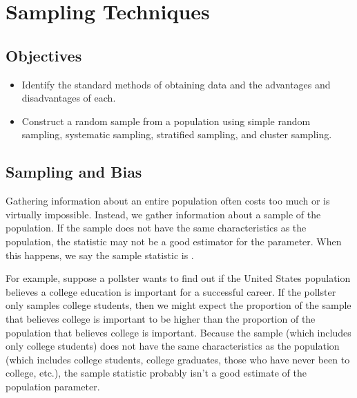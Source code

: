 \documentclass[letterpaper,10pt,english]{jupyterBook}
\begin{document}
\sphinxstepscope


\section{Sampling Techniques}
\label{\detokenize{Ch1 Sampling and Data/1.3 Sampling Techniques:sampling-techniques}}\label{\detokenize{Ch1 Sampling and Data/1.3 Sampling Techniques::doc}}

\subsection{Objectives}
\label{\detokenize{Ch1 Sampling and Data/1.3 Sampling Techniques:objectives}}\begin{itemize}
\item {} 
\sphinxAtStartPar
Identify the standard methods of obtaining data and the advantages and disadvantages of each.

\item {} 
\sphinxAtStartPar
Construct a random sample from a population using simple random sampling, systematic sampling, stratified sampling, and cluster sampling.

\end{itemize}


\subsection{Sampling and Bias}
\label{\detokenize{Ch1 Sampling and Data/1.3 Sampling Techniques:sampling-and-bias}}
\sphinxAtStartPar
Gathering information about an entire population often costs too much or is virtually impossible. Instead, we gather information about a sample of the population.  If the sample does not have the same characteristics as the population, the statistic may not be a good estimator for the parameter. When this happens, we say the sample statistic is .

\sphinxAtStartPar
For example, suppose a pollster wants to find out if the United States population believes a college education is important for a successful career. If the pollster only samples college students, then we might expect the proportion of the sample that believes college is important to be higher than the proportion of the population that believes college is important. Because the sample (which includes only college students) does not have the same characteristics as the population (which includes college students, college graduates, those who have never been to college, etc.), the sample statistic probably isn’t a good estimate of the population parameter.
\end{document}
